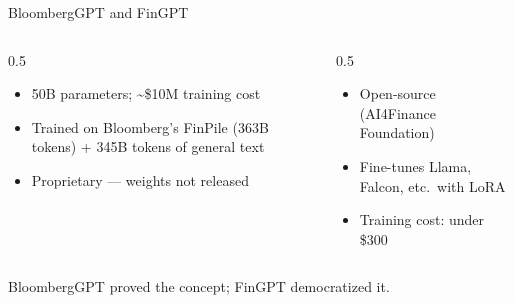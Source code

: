 \documentclass[aspectratio=169]{beamer}
\begin{document}
\begin{frame}{BloombergGPT and FinGPT}
\begin{columns}[T]
\begin{column}{0.5\textwidth}
\begin{shadedbox}[title=\textbf{BloombergGPT (2023)}]
\begin{itemize}\footnotesize
  \item 50B parameters; \textasciitilde\$10M training cost
  \item Trained on Bloomberg's FinPile (363B tokens) + 345B tokens of general text
  \item \alert{Proprietary} --- weights not released
\end{itemize}
\end{shadedbox}
\end{column}
\begin{column}{0.5\textwidth}
\begin{shadedbox}[title=\textbf{FinGPT (2023)}]
\begin{itemize}\footnotesize
  \item Open-source (AI4Finance Foundation)
  \item Fine-tunes Llama, Falcon, etc.\ with LoRA
  \item Training cost: \alert{under \$300}
\end{itemize}
\end{shadedbox}
\end{column}
\end{columns}
\vspace{0.3cm}
\begin{center}
\alert{BloombergGPT proved the concept; FinGPT democratized it.}
\end{center}
\end{frame}
\end{document}
